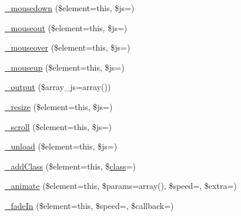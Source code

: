 \begin{DoxyCompactItemize}
\item 
\mbox{\hyperlink{class_c_i___jquery_a95cb3f44c2413b0fbe51734b346f4d92}{\+\_\+mousedown}} (\$element=\textquotesingle{}this\textquotesingle{}, \$js=\textquotesingle{}\textquotesingle{})
\item 
\mbox{\hyperlink{class_c_i___jquery_a8a575b3b64cda3a24434e8fed1553124}{\+\_\+mouseout}} (\$element=\textquotesingle{}this\textquotesingle{}, \$js=\textquotesingle{}\textquotesingle{})
\item 
\mbox{\hyperlink{class_c_i___jquery_abe38c17415cf07abb6de435525676dca}{\+\_\+mouseover}} (\$element=\textquotesingle{}this\textquotesingle{}, \$js=\textquotesingle{}\textquotesingle{})
\item 
\mbox{\hyperlink{class_c_i___jquery_a78d654cce0aaa6de766809e56b727261}{\+\_\+mouseup}} (\$element=\textquotesingle{}this\textquotesingle{}, \$js=\textquotesingle{}\textquotesingle{})
\item 
\mbox{\hyperlink{class_c_i___jquery_a6a837913fb7adb3e611aa97a89d56a6e}{\+\_\+output}} (\$array\+\_\+js=array())
\item 
\mbox{\hyperlink{class_c_i___jquery_a6a056a14d5944d85fa6e198c609df475}{\+\_\+resize}} (\$element=\textquotesingle{}this\textquotesingle{}, \$js=\textquotesingle{}\textquotesingle{})
\item 
\mbox{\hyperlink{class_c_i___jquery_a8242a35dd382dd24e4bb7eaba2be2982}{\+\_\+scroll}} (\$element=\textquotesingle{}this\textquotesingle{}, \$js=\textquotesingle{}\textquotesingle{})
\item 
\mbox{\hyperlink{class_c_i___jquery_a967b2d5e889abc76a2389f2c34df14f7}{\+\_\+unload}} (\$element=\textquotesingle{}this\textquotesingle{}, \$js=\textquotesingle{}\textquotesingle{})
\item 
\mbox{\hyperlink{class_c_i___jquery_ac51392df39f9adbe6638324664c6319e}{\+\_\+add\+Class}} (\$element=\textquotesingle{}this\textquotesingle{}, \$\mbox{\hyperlink{waiter_2olaporan_8php_a185c73c6507391d1eb38c776b68ce96d}{class}}=\textquotesingle{}\textquotesingle{})
\item 
\mbox{\hyperlink{class_c_i___jquery_a0bec4feda29c0c883eccf40af8545c8c}{\+\_\+animate}} (\$element=\textquotesingle{}this\textquotesingle{}, \$params=array(), \$speed=\textquotesingle{}\textquotesingle{}, \$extra=\textquotesingle{}\textquotesingle{})
\item 
\mbox{\hyperlink{class_c_i___jquery_a2d323b3e6a8e62d1a940cbf58e216992}{\+\_\+fade\+In}} (\$element=\textquotesingle{}this\textquotesingle{}, \$speed=\textquotesingle{}\textquotesingle{}, \$callback=\textquotesingle{}\textquotesingle{})

\end{DoxyCompactItemize}
